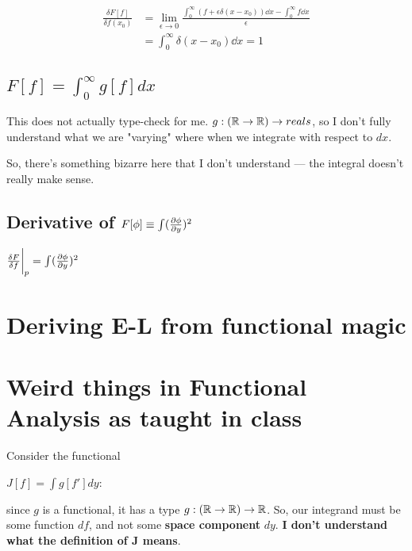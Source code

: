 \begin{align*}
    \frac{\delta F[f]}{\delta f (x_0)} &=
        \lim_{\epsilon \to 0} 
         \frac{\int_0^\infty (f + \epsilon \delta (x - x_0)) \dd x- \int_0^\infty f \dd x }{\epsilon} \\
         &= \int_0^\infty \delta(x - x_0) \dd x = 1
\end{align*}

\subsection{$F[f] = \int_0^\infty g [f] dx$}
This does not actually type-check for me. $g: (\mathbb{R} \to \mathbb{R}) \to reals$,
so I don't fully understand what we are "varying" where when we integrate
with respect to $dx$.

So, there's something bizarre here that I don't understand --- the 
integral doesn't really make sense.

\subsection{Derivative of $F[\phi] \equiv \int (\pdv{\phi}{y})^2$}

$\fdv{F}{f}{\bigg \rvert_p} = \int (\pdv{\phi}{y})^2$


\section{Deriving E-L from functional magic}

\section{Weird things in Functional Analysis as taught in class}

Consider the functional

$J[f] = \int g[f'] dy$:

since $g$ is a functional, it has a type $g: (\mathbb{R} \to \mathbb{R}) \to \mathbb{R}$.
So, our integrand must be some function $df$, and not some
\textbf{space component} $dy$. \textbf{I don't understand what the definition of J means}.

